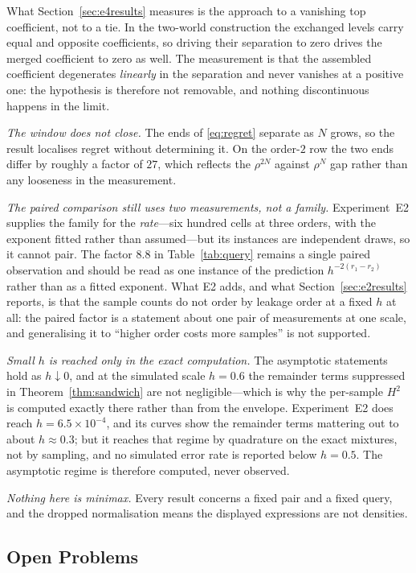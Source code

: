 \documentclass[conference]{IEEEtran}
\theoremstyle{definition}
\begin{document}
What Section~\ref{sec:e4results} measures is the approach to a vanishing top coefficient, not
to a tie. In the two-world construction the exchanged levels carry equal and opposite
coefficients, so driving their separation to zero drives the merged coefficient to zero as
well. The measurement is that the assembled coefficient degenerates \emph{linearly} in the
separation and never vanishes at a positive one: the hypothesis is therefore not removable,
and nothing discontinuous happens in the limit.

\emph{The window does not close.} The ends of \eqref{eq:regret} separate as $N$ grows, so the
result localises regret without determining it. On the order-$2$ row the two ends differ by
roughly a factor of $27$, which reflects the $\rho^{2N}$ against $\rho^{N}$ gap rather than
any looseness in the measurement.

\emph{The paired comparison still uses two measurements, not a family.} Experiment~E2 supplies
the family for the \emph{rate}---six hundred cells at three orders, with the exponent fitted
rather than assumed---but its instances are independent draws, so it cannot pair. The factor
$8.8$ in Table~\ref{tab:query} remains a single paired observation and should be read as one
instance of the prediction $h^{-2(r_{1}-r_{2})}$ rather than as a fitted exponent. What E2
adds, and what Section~\ref{sec:e2results} reports, is that the sample counts do not order by
leakage order at a fixed $h$ at all: the paired factor is a statement about one pair of
measurements at one scale, and generalising it to ``higher order costs more samples'' is not
supported.

\emph{Small $h$ is reached only in the exact computation.} The asymptotic statements hold as
$h\downarrow0$, and at the simulated scale $h=0.6$ the remainder terms suppressed in
Theorem~\ref{thm:sandwich} are not negligible---which is why the per-sample $H^{2}$ is computed
exactly there rather than from the envelope. Experiment~E2 does reach $h=6.5\times10^{-4}$, and
its curves show the remainder terms mattering out to about $h\approx0.3$; but it reaches that
regime by quadrature on the exact mixtures, not by sampling, and no simulated error rate is
reported below $h=0.5$. The asymptotic regime is therefore computed, never observed.

\emph{Nothing here is minimax.} Every result concerns a fixed pair and a fixed query, and
the dropped normalisation means the displayed expressions are not densities.

\subsection{Open Problems}
\end{document}
